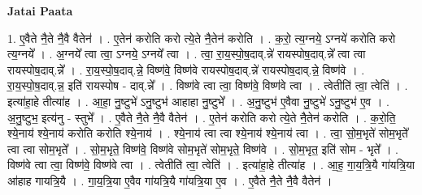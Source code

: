 \documentclass[17pt]{extarticle}
\begin{document}
\textbf{Jatai Paata} \newline

1. ए॒वैते नै॒ते नै॒वै वैतेन॑ । . ए॒तेन॑ करोति करो त्ये॒ते नै॒तेन॑ करोति । . क॒रो॒ त्य॒ग्नये॒ ऽग्नये॑ करोति करो त्य॒ग्नये᳚ । . अ॒ग्नये᳚ त्वा त्वा॒ ऽग्नये॒ ऽग्नये᳚ त्वा । . त्वा॒ रा॒य॒स्पो॒ष॒दाव्.न्ने॑ रायस्पोष॒दाव्.न्ने᳚ त्वा त्वा रायस्पोष॒दाव्.न्ने᳚ । . रा॒य॒स्पो॒ष॒दाव्.न्ने॒ विष्ण॑वे॒ विष्ण॑वे रायस्पोष॒दाव्.न्ने॑ रायस्पोष॒दाव्.न्ने॒ विष्ण॑वे । . रा॒य॒स्पो॒ष॒दाव्.न्न॒ इति॑ रायस्पोष - दाव्.न्ने᳚ । . विष्ण॑वे त्वा त्वा॒ विष्ण॑वे॒ विष्ण॑वे त्वा । . त्वेतीति॑ त्वा॒ त्वेति॑ । . इत्या॑हा॒हे तीत्या॑ह । . आ॒हा॒ नु॒ष्टुभे॑ ऽनु॒ष्टुभ॑ आहाहा नु॒ष्टुभे᳚ । . अ॒नु॒ष्टुभ॑ ए॒वैवा नु॒ष्टुभे॑ ऽनु॒ष्टुभ॑ ए॒व । . अ॒नु॒ष्टुभ॒ इत्य॑नु - स्तुभे᳚ । . ए॒वैते नै॒ते नै॒वै वैतेन॑ । . ए॒तेन॑ करोति करो त्ये॒ते नै॒तेन॑ करोति । . क॒रो॒ति॒ श्ये॒नाय॑ श्ये॒नाय॑ करोति करोति श्ये॒नाय॑ । . श्ये॒नाय॑ त्वा त्वा श्ये॒नाय॑ श्ये॒नाय॑ त्वा । . त्वा॒ सो॒म॒भृते॑ सोम॒भृते᳚ त्वा त्वा सोम॒भृते᳚ । . सो॒म॒भृते॒ विष्ण॑वे॒ विष्ण॑वे सोम॒भृते॑ सोम॒भृते॒ विष्ण॑वे । . सो॒म॒भृत॒ इति॑ सोम - भृते᳚ । . विष्ण॑वे त्वा त्वा॒ विष्ण॑वे॒ विष्ण॑वे त्वा । . त्वेतीति॑ त्वा॒ त्वेति॑ । . इत्या॑हा॒हे तीत्या॑ह । . आ॒ह॒ गा॒य॒त्रि॒यै गा॑यत्रि॒या आ॑हाह गायत्रि॒यै । . गा॒य॒त्रि॒या ए॒वैव गा॑यत्रि॒यै गा॑यत्रि॒या ए॒व । . ए॒वैते नै॒ते नै॒वै वैतेन॑ । \newline
\end{document}
